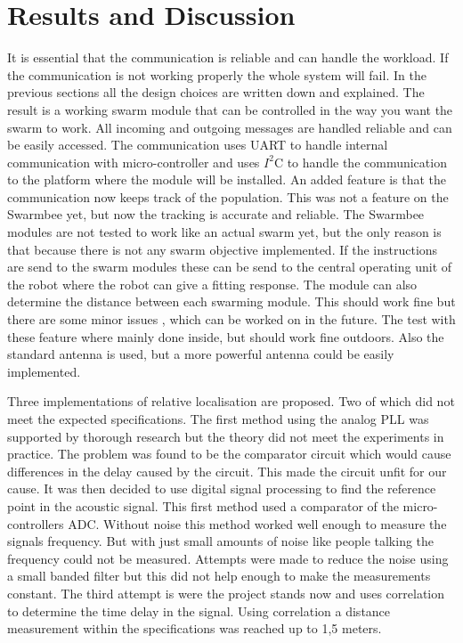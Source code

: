 \documentclass[10pt,a4paper]{article}
\begin{document}
\section{Results and Discussion}
It is essential that the communication is reliable and can handle the workload. If the communication is not working properly the whole system will fail. In the previous sections all the design choices are written down and explained. The result is a working swarm module that can be controlled in the way you want the swarm to work. All incoming and outgoing messages are handled reliable and can be easily accessed. The communication uses UART to handle internal communication with micro-controller and uses $I^2$C to handle the communication to the platform where the module will be installed. An added feature is that the communication now keeps track of the population. This was not a feature on the Swarmbee yet, but now the tracking is accurate and reliable. The Swarmbee modules are not tested to work like an actual swarm yet, but the only reason is that because there is not any swarm objective implemented. If the instructions are send to the swarm modules these can be send to the central operating unit of the robot where the robot can give a fitting response. The module can also determine the distance between each swarming module. This should work fine but there are some minor issues , which can be worked on in the future. The test with these feature where mainly done inside, but should work fine outdoors. Also the standard antenna is used, but a more powerful antenna could be easily implemented.

Three implementations of relative localisation are proposed. Two of which did not meet the expected specifications. The first method using the analog PLL was supported by thorough research but the theory did not meet the experiments in practice. The problem was found to be the comparator circuit which would cause differences in the delay caused by the circuit. This made the circuit unfit for our cause. It was then decided to use digital signal processing to find the reference point in the acoustic signal. This first method used a comparator of the micro-controllers ADC. Without noise this method worked well enough to measure the signals frequency. But with just small amounts of noise like people talking the frequency could not be measured. Attempts were made to reduce the noise using a small banded filter but this did not help enough to make the measurements constant. The third attempt is were the project stands now and uses correlation to determine the time delay in the signal. Using correlation a distance measurement within the specifications was reached up to 1,5 meters. 
\end{document}
